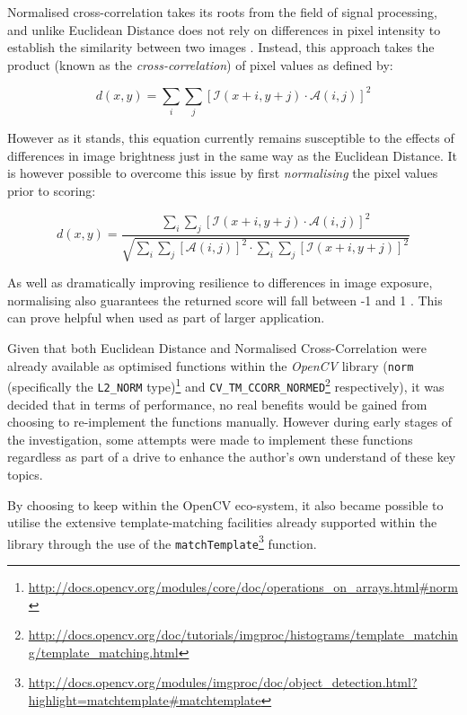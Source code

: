Normalised cross-correlation takes its roots from the field of signal processing, and unlike Euclidean Distance does not rely on differences in pixel intensity to establish the similarity between two images \cite{szeliski}. Instead, this approach takes the product (known as the \textit{cross-correlation}) of pixel values as defined by:

\begin{equation}
d(x, y) = \sum\limits_{i}\sum\limits_{j}[\mathcal{I}(x + i, y + j) \cdot \mathcal{A}(i, j)]^2
\end{equation}

However as it stands, this equation currently remains susceptible to the effects of differences in image brightness just in the same way as the Euclidean Distance. It is however possible to overcome this issue by first \textit{normalising} the pixel values prior to scoring: 

\begin{equation}
d(x, y) = \frac{\sum\limits_{i}\sum\limits_{j}[\mathcal{I}(x + i, y + j) \cdot \mathcal{A}(i, j)]^2}{\sqrt{\sum\limits_{i}\sum\limits_{j}[\mathcal{A}(i, j)]^2 \cdot \sum\limits_{i}\sum\limits_{j}[\mathcal{I}(x + i, y + j)]^2}}
\end{equation}

As well as dramatically improving resilience to differences in image exposure, normalising also guarantees the returned score will fall between -1 and 1 \cite{szeliski}. This can prove helpful when used as part of larger application. 

Given that both Euclidean Distance and Normalised Cross-Correlation were already available as optimised functions within the \textit{OpenCV} library (\texttt{norm} (specifically the \texttt{L2\_NORM} type)\footnote{\url{http://docs.opencv.org/modules/core/doc/operations_on_arrays.html#norm}} and \texttt{CV\_TM\_CCORR\_NORMED}\footnote{\url{http://docs.opencv.org/doc/tutorials/imgproc/histograms/template_matching/template_matching.html}} respectively), it was decided that in terms of performance, no real benefits would be gained from choosing to re-implement the functions manually. However during early stages of the investigation, some attempts were made to implement these functions regardless as part of a drive to enhance the author's own understand of these key topics.

By choosing to keep within the OpenCV eco-system, it also became possible to utilise the extensive template-matching facilities already supported within the library through the use of the \texttt{matchTemplate}\footnote{\url{http://docs.opencv.org/modules/imgproc/doc/object_detection.html?highlight=matchtemplate#matchtemplate}} function.

